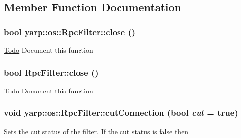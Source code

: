 \subsection{Member Function Documentation}
\hypertarget{classyarp_1_1os_1_1_rpc_filter_a8bbb27455374614e29987fc7dc84aead}{
\subsubsection[{close}]{\setlength{\rightskip}{0pt plus 5cm}bool yarp::os::RpcFilter::close ()}}
\label{classyarp_1_1os_1_1_rpc_filter_a8bbb27455374614e29987fc7dc84aead}
\begin{Desc}
\item[\hyperlink{todo__todo000019}{Todo}]Document this function \end{Desc}
\hypertarget{classyarp_1_1os_1_1_rpc_filter_a7c3fd3737767ad8ae8730e44e96d1f20}{
\subsubsection[{close}]{\setlength{\rightskip}{0pt plus 5cm}bool RpcFilter::close ()}}
\label{classyarp_1_1os_1_1_rpc_filter_a7c3fd3737767ad8ae8730e44e96d1f20}
\begin{Desc}
\item[\hyperlink{todo__todo000009}{Todo}]Document this function \end{Desc}
\hypertarget{classyarp_1_1os_1_1_rpc_filter_ac6e9845cea3a4e90019d9b8608ebf531}{
\subsubsection[{cutConnection}]{\setlength{\rightskip}{0pt plus 5cm}void yarp::os::RpcFilter::cutConnection (bool {\em cut} = {\ttfamily true})}}
\label{classyarp_1_1os_1_1_rpc_filter_ac6e9845cea3a4e90019d9b8608ebf531}
Sets the cut status of the filter. If the cut status is {\ttfamily false} then
